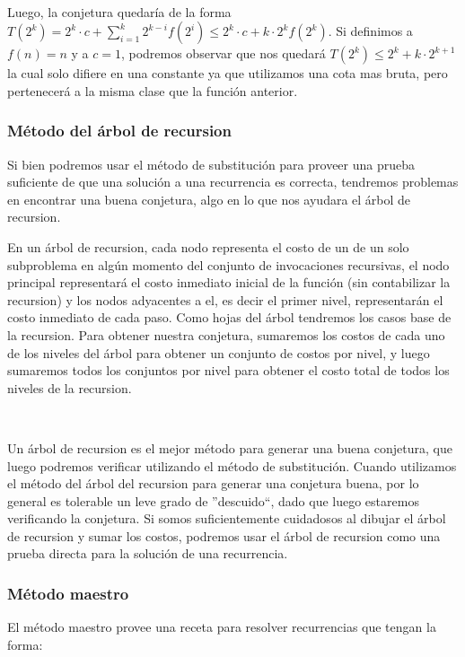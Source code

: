 \documentclass[10pt, a4paper]{report}
\begin{document}
~

Luego, la conjetura quedar\'ia de la forma $T(2^k) = 2^k \cdot c + \sum_{i=1}^k 2^{k-i} f(2^i) \leq 2^k \cdot c + k \cdot 2^k f(2^k)$. Si definimos a $f(n) = n$ y a $c=1$, podremos observar que nos quedar\'a $T(2^k) \leq 2^k + k \cdot 2^{k+1}$ la cual solo difiere en una constante ya que utilizamos una cota mas bruta, pero pertenecer\'a a la misma clase que la funci\'on anterior.

\subsubsection{M\'etodo del \'arbol de recursion}

Si bien podremos usar el m\'etodo de substituci\'on para proveer una prueba suficiente de que una soluci\'on a una recurrencia es correcta, tendremos problemas en encontrar una buena conjetura, algo en lo que nos ayudara el \'arbol de recursion. 

En un \'arbol de recursion, cada nodo representa el costo de un de un solo subproblema en alg\'un momento del conjunto de invocaciones recursivas, el nodo principal representar\'a el costo inmediato inicial de la funci\'on (sin contabilizar la recursion) y los nodos adyacentes a el, es decir el primer nivel, representar\'an el costo inmediato de cada paso. Como hojas del \'arbol tendremos los casos base de la recursion. Para obtener nuestra conjetura, sumaremos los costos de cada uno de los niveles del \'arbol para obtener un conjunto de costos por nivel, y luego sumaremos todos los conjuntos por nivel para obtener el costo total de todos los niveles de la recursion.

~

Un \'arbol de recursion es el mejor m\'etodo para generar una buena conjetura, que luego podremos verificar utilizando el m\'etodo de substituci\'on. Cuando utilizamos el m\'etodo del \'arbol del recursion para generar una conjetura buena, por lo general es tolerable un leve grado de ''descuido``, dado que luego estaremos verificando la conjetura. Si somos suficientemente cuidadosos al dibujar el \'arbol de recursion y sumar los costos, podremos usar el \'arbol de recursion como una prueba directa para la soluci\'on de una recurrencia.

\subsubsection{M\'etodo maestro}

El m\'etodo maestro provee una receta para resolver recurrencias que tengan la forma:
\end{document}
